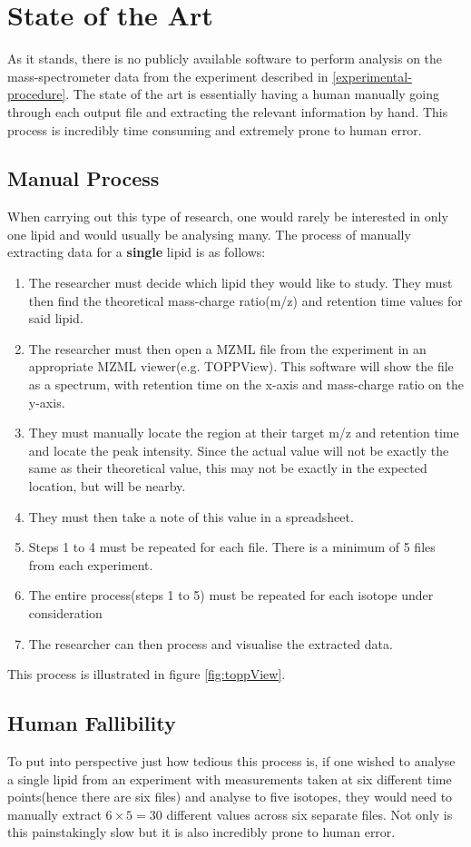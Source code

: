 \documentclass{l4proj}
\begin{document}
\section{State of the Art} \label{state-of-the-art}
As it stands, there is no publicly available software to perform analysis on the mass-spectrometer data from the experiment described in \ref{experimental-procedure}. The state of the art is essentially having a human manually going through each output file and extracting the relevant information by hand. This process is incredibly time consuming and extremely prone to human error.
\subsection{Manual Process}\label{manual-process}
When carrying out this type of research, one would rarely be interested in only one lipid and would usually be analysing many. The process of manually extracting data for a \textbf{single} lipid is as follows:
\begin{enumerate}
    \item The researcher must decide which lipid they would like to study. They must then find the theoretical mass-charge ratio(m/z) and retention time values for said lipid.  
    \item The researcher must then open a MZML file from the experiment in an appropriate MZML viewer(e.g. TOPPView). This software will show the file as a spectrum, with retention time on the x-axis and mass-charge ratio on the y-axis.
    \item They must manually locate the region at their target m/z and retention time and locate the peak intensity. Since the actual value will not be exactly the same as their theoretical value, this may not be exactly in the expected location, but will be nearby. 
    \item They must then take a note of this value in a spreadsheet.
    \item Steps 1 to 4 must be repeated for each file. There is a minimum of 5 files from each experiment.
    \item The entire process(steps 1 to 5) must be repeated for each isotope under consideration
    \item The researcher can then process and visualise the extracted data.
\end{enumerate}
This process is illustrated in figure \ref{fig:toppView}.
\subsection{Human Fallibility}
To put into perspective just how tedious this process is, if one wished to analyse a single lipid from an experiment with measurements taken at six different time points(hence there are six files) and analyse to five isotopes, they would need to manually extract $6\times5=30$ different values across six separate files. Not only is this painstakingly slow but it is also incredibly prone to human error.
\end{document}
